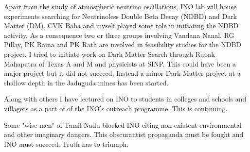 Apart from the study of atmospheric neutrino oscillations, INO lab will 
house experiments searching for Neutrinoless Double Beta Decay (NDBD) 
and Dark Matter (DM). CVK Baba and myself played some role in initiating 
the NDBD activity. As a consequence two or three groups involving 
Vandana Nanal, RG Pillay, PK Raina and PK Rath are involved in 
feasibility studies for the NDBD project. I tried to initiate work on 
Dark Matter Search through Rupak Mahapatra of Texas A and M and 
physicists at SINP. This could have been a major project but it did not 
succeed. Instead a minor Dark Matter project at a shallow depth in the 
Jaduguda mines has been started.

Along with others I have lectured on INO to students in colleges and 
schools and villagers as a part of of the INO's outreach programme. This 
is continuing.

Some "wise men" of Tamil Nadu blocked INO citing non-existent 
environmental and other imaginary dangers. This obscurantist propaganda 
must be fought and INO must succeed. Truth has to triumph.

\newpage

